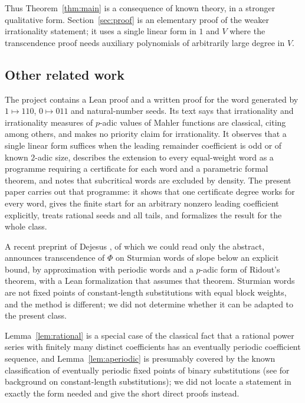 \documentclass[11pt,reqno]{amsart}
\theoremstyle{definition}
\theoremstyle{remark}
\begin{document}
Thus Theorem~\ref{thm:main} is a consequence of known theory, in a
stronger qualitative form.  Section~\ref{sec:proof} is an elementary proof of the
weaker irrationality statement; it uses a single linear form in $1$ and
$V$ where the transcendence proof needs auxiliary polynomials of
arbitrarily large degree in $V$.

\subsection{Other related work}
The project \cite{Upstream} contains a Lean proof and a written proof for
the word generated by $1\mapsto 110$, $0\mapsto 011$ and natural-number
seeds.  Its text says that irrationality and irrationality measures of $p$-adic
values of Mahler functions are classical, citing
\cite{LoxtonvdPoorten1982} among others, and makes no priority claim for
irrationality.  It observes that a single linear form suffices when the
leading remainder coefficient is odd or of known $2$-adic size, describes
the extension to every equal-weight word as a programme requiring a
certificate for each word and a parametric formal theorem, and notes that
subcritical words are excluded by density.  The present paper carries out
that programme: it shows that one certificate degree works for every
word, gives the finite start for an arbitrary nonzero leading coefficient
explicitly, treats rational seeds and all tails, and formalizes the
result for the whole class.

A recent preprint of Dejesus \cite{Dejesus2026}, of which we could read
only the abstract, announces transcendence of $\Phi$ on Sturmian words of
slope below an explicit bound, by approximation with periodic words and a
$p$-adic form of Ridout's theorem, with a Lean formalization that assumes
that theorem.  Sturmian words are not fixed points of constant-length
substitutions with equal block weights, and the method is different; we did
not determine whether it can be adapted to the present class.

Lemma~\ref{lem:rational} is a special case of the classical fact that a
rational power series with finitely many distinct coefficients has an
eventually periodic coefficient sequence, and Lemma~\ref{lem:aperiodic} is
presumably covered by the known classification of eventually periodic
fixed points of binary substitutions (see \cite{AlloucheShallit2003} for
background on constant-length substitutions); we did not locate a statement
in exactly the form needed and give the short direct proofs instead.
\end{document}
